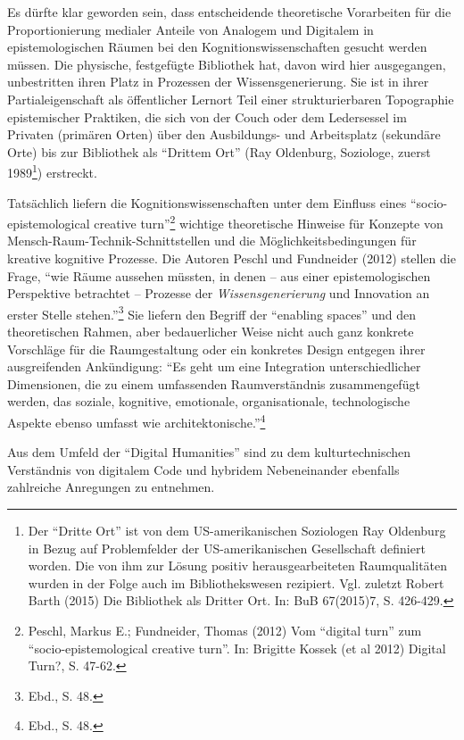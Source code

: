 \documentclass[a4paper,
fontsize=11pt,
oneside,
numbers=noperiodatend,
parskip=half-,
bibliography=totoc,
final
]{scrartcl}
\begin{document}
Es dürfte klar geworden sein, dass entscheidende theoretische
Vorarbeiten für die Proportionierung medialer Anteile von Analogem und
Digitalem in epistemologischen Räumen bei den Kognitionswissenschaften
gesucht werden müssen. Die physische, festgefügte Bibliothek hat, davon
wird hier ausgegangen, unbestritten ihren Platz in Prozessen der
Wissensgenerierung. Sie ist in ihrer Partialeigenschaft als öffentlicher
Lernort Teil einer strukturierbaren Topographie epistemischer Praktiken,
die sich von der Couch oder dem Ledersessel im Privaten (primären Orten)
über den Ausbildungs- und Arbeitsplatz (sekundäre Orte) bis zur
Bibliothek als \enquote{Drittem Ort} (Ray Oldenburg, Soziologe, zuerst
1989\footnote{Der \enquote{Dritte Ort} ist von dem US-amerikanischen
  Soziologen Ray Oldenburg in Bezug auf Problemfelder der
  US-amerikanischen Gesellschaft definiert worden. Die von ihm zur
  Lösung positiv herausgearbeiteten Raumqualitäten wurden in der Folge
  auch im Bibliothekswesen rezipiert. Vgl. zuletzt Robert Barth (2015)
  Die Bibliothek als Dritter Ort. In: BuB 67(2015)7, S. 426-429.})
erstreckt.

Tatsächlich liefern die Kognitionswissenschaften unter dem Einfluss
eines \enquote{socio-epistemological creative turn}\footnote{Peschl,
  Markus E.; Fundneider, Thomas (2012) Vom \enquote{digital turn} zum
  \enquote{socio-epistemological creative turn}. In: Brigitte Kossek (et
  al 2012) Digital Turn?, S. 47-62.} wichtige theoretische Hinweise für
Konzepte von Mensch-Raum-Technik-Schnittstellen und die
Möglichkeitsbedingungen für kreative kognitive Prozesse. Die Autoren
Peschl und Fundneider (2012) stellen die Frage, \enquote{wie Räume
aussehen müssten, in denen -- aus einer epistemologischen Perspektive
betrachtet -- Prozesse der \emph{Wissensgenerierung} und Innovation an
erster Stelle stehen.}\footnote{Ebd., S. 48.} Sie liefern den Begriff
der \enquote{enabling spaces} und den theoretischen Rahmen, aber
bedauerlicher Weise nicht auch ganz konkrete Vorschläge für die
Raumgestaltung oder ein konkretes Design entgegen ihrer ausgreifenden
Ankündigung: \enquote{Es geht um eine Integration unterschiedlicher
Dimensionen, die zu einem umfassenden Raumverständnis zusammengefügt
werden, das soziale, kognitive, emotionale, organisationale,
technologische Aspekte ebenso umfasst wie architektonische.}\footnote{Ebd.,
  S. 48.}

Aus dem Umfeld der \enquote{Digital Humanities} sind zu dem
kulturtechnischen Verständnis von digitalem Code und hybridem
Nebeneinander ebenfalls zahlreiche Anregungen zu entnehmen.
\end{document}

